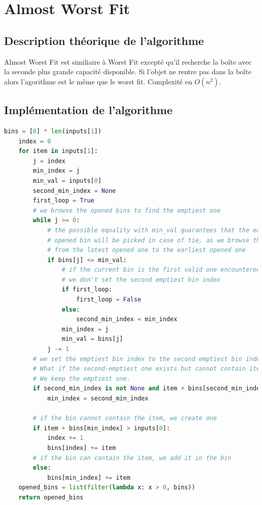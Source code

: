 \documentclass{article}
\begin{document}

\section{Almost Worst Fit}

\subsection{Description théorique de l'algorithme}
Almost Worst Fit est similiaire à Worst Fit excepté qu'il recherche la boîte avec la seconde plus grande capacité
disponible.
Si l'objet ne rentre pas dans la boîte alors l'agorithme est le même que le worst fit.
Complexité en $O(n^2)$.

\subsection{Implémentation de l'algorithme}
\begin{lstlisting}[language=Python, frame=single]
    bins = [0] * len(inputs[1])
    index = 0
    for item in inputs[1]:
        j = index
        min_index = j
        min_val = inputs[0]
        second_min_index = None
        first_loop = True
        # we browse the opened bins to find the emptiest one
        while j >= 0:
            # the possible equality with min_val guarantees that the earliest
            # opened bin will be picked in case of tie, as we browse the bins
            # from the latest opened one to the earliest opened one
            if bins[j] <= min_val:
                # if the current bin is the first valid one encountered,
                # we don't set the second emptiest bin index
                if first_loop:
                    first_loop = False
                else:
                    second_min_index = min_index
                min_index = j
                min_val = bins[j]
            j -= 1
        # we set the emptiest bin index to the second emptiest bin index if it exists
        # What if the second-emptiest one exists but cannot contain item ?
        # We keep the emptiest one.
        if second_min_index is not None and item + bins[second_min_index] < inputs[0]:
            min_index = second_min_index

        # if the bin cannot contain the item, we create one
        if item + bins[min_index] > inputs[0]:
            index += 1
            bins[index] += item
        # if the bin can contain the item, we add it in the bin
        else:
            bins[min_index] += item
    opened_bins = list(filter(lambda x: x > 0, bins))
    return opened_bins
\end{lstlisting}
\end{document}
